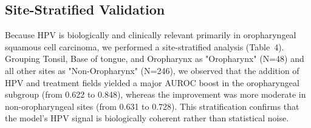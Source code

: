 \documentclass[11pt]{article}
\begin{document}
\begin{table}[H]
\centering
\caption{Reconciliation of primary cross-validation and secondary single-split performance.}
\scriptsize
{}
\end{table}

\subsection{Site-Stratified Validation}
Because HPV is biologically and clinically relevant primarily in oropharyngeal squamous cell carcinoma, we performed a site-stratified analysis (Table~4). Grouping Tonsil, Base of tongue, and Oropharynx as "Oropharynx" (N=48) and all other sites as "Non-Oropharynx" (N=246), we observed that the addition of HPV and treatment fields yielded a major AUROC boost in the oropharyngeal subgroup (from 0.622 to 0.848), whereas the improvement was more moderate in non-oropharyngeal sites (from 0.631 to 0.728). This stratification confirms that the model's HPV signal is biologically coherent rather than statistical noise.
\end{document}
